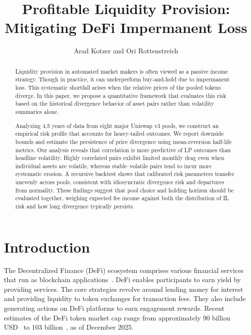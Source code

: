 \documentclass[journal]{IEEEtran}
\title{Profitable Liquidity Provision: Mitigating DeFi Impermanent Loss}
\author{Arad Kotzer and Ori Rottenstreich}
\begin{document}
\maketitle

\begin{abstract}
Liquidity provision in automated market makers is often viewed as a passive income strategy. Though in practice, it can underperform buy-and-hold due to impermanent loss. This systematic shortfall arises when the relative prices of the pooled tokens diverge. In this paper, we propose a quantitative framework that evaluates this risk based on the historical divergence behavior of asset pairs rather than volatility summaries alone.

Analyzing 4.5 years of data from eight major Uniswap v3 pools, we construct an empirical risk profile that accounts for heavy-tailed outcomes. We report downside bounds and estimate the persistence of price divergence using mean-reversion half-life metrics. Our analysis reveals that correlation is more predictive of LP outcomes than headline volatility. Highly correlated pairs exhibit limited monthly drag even when individual assets are volatile, whereas stable--volatile pairs tend to incur more systematic erosion.
A recursive backtest shows that calibrated risk parameters transfer unevenly across pools, consistent with idiosyncratic divergence risk and departures from normality. 
These findings suggest that pool choice and holding horizon should be evaluated together, weighing expected fee income against both the distribution of IL risk and how long divergence typically persists.
\end{abstract}



\pagestyle{plain}
\thispagestyle{empty}

\section{Introduction}

The Decentralized Finance (DeFi) ecosystem comprises various financial services that run as blockchain applications~\cite{schar2021decentralized, zetzsche2020decentralized, jensen2021introduction, Bitcoin, wood2014ethereum}. DeFi enables participants to earn yield by providing services. The core strategies revolve around lending money for interest and providing liquidity to token exchanges for transaction fees. They also include generating actions on DeFi platforms to earn engagement rewards. Recent estimates of the DeFi token market cap range from approximately 90 billion USD~\cite{forbes2025defi} to 103 billion~\cite{coingecko2025defi}, as of December 2025.
\end{document}
